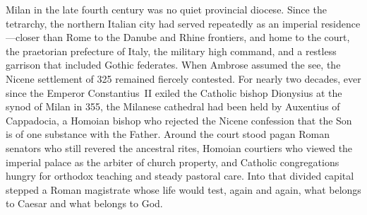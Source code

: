 Milan in the late fourth century was no quiet provincial diocese. Since the tetrarchy, the northern Italian city had served repeatedly as an imperial residence---closer than Rome to the Danube and Rhine frontiers, and home to the court, the praetorian prefecture of Italy, the military high command, and a restless garrison that included Gothic federates. When Ambrose assumed the see, the Nicene settlement of 325 remained fiercely contested. For nearly two decades, ever since the Emperor Constantius~II exiled the Catholic bishop Dionysius at the synod of Milan in 355, the Milanese cathedral had been held by Auxentius of Cappadocia, a Homoian bishop who rejected the Nicene confession that the Son is of one substance with the Father. Around the court stood pagan Roman senators who still revered the ancestral rites, Homoian courtiers who viewed the imperial palace as the arbiter of church property, and Catholic congregations hungry for orthodox teaching and steady pastoral care. Into that divided capital stepped a Roman magistrate whose life would test, again and again, what belongs to Caesar and what belongs to God.
